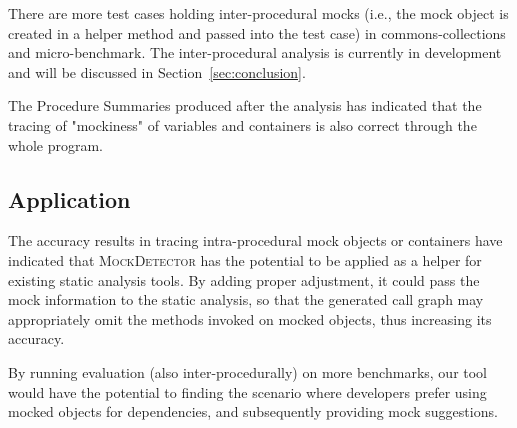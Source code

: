 There are more test cases holding inter-procedural mocks (i.e., the mock object is created in a helper method and passed into the test case) in commons-collections and micro-benchmark. The inter-procedural analysis is currently in development and will be discussed in Section~\ref{sec:conclusion}.

The Procedure Summaries produced after the analysis has indicated that the tracing of "mockiness" of variables and containers is also correct through the whole program. 

\subsection{Application}
\label{subsec:static}

The accuracy results in tracing intra-procedural mock objects or containers have indicated that \textsc{MockDetector} has the potential to be applied as a helper for existing static analysis tools. By adding proper adjustment, it could pass the mock information to the static analysis, so that the generated call graph may appropriately omit the methods invoked on mocked objects, thus increasing its accuracy.

By running evaluation (also inter-procedurally) on more benchmarks, our tool would have the potential to finding the scenario where developers prefer using mocked objects for dependencies, and subsequently providing mock suggestions.